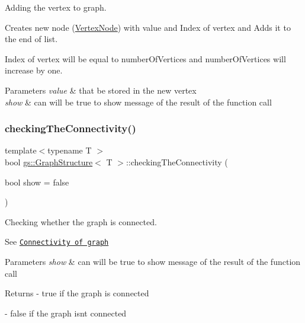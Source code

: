 Adding the vertex to graph. 

Creates new node (\mbox{\hyperlink{structgs_1_1_vertex_node}{Vertex\+Node}}) with \textquotesingle{}value\textquotesingle{} and Index of vertex and Adds it to the end of \textquotesingle{}list\textquotesingle{}.

Index of vertex will be equal to \textquotesingle{}number\+Of\+Vertices\textquotesingle{} and \textquotesingle{}number\+Of\+Vertices\textquotesingle{} will increase by one.


\begin{DoxyParams}{Parameters}
{\em value} & that be stored in the new vertex \\
\hline
{\em show} & can will be true to show message of the result of the function call \\
\hline
\end{DoxyParams}
\mbox{\label{classgs_1_1_graph_structure_a969a88dd678fd5b16884a6ab2cb68a60}} 
\subsubsection{\texorpdfstring{checking\+The\+Connectivity()}{checkingTheConnectivity()}}
{\footnotesize\ttfamily template$<$typename T $>$ \\
bool \mbox{\hyperlink{classgs_1_1_graph_structure}{gs\+::\+Graph\+Structure}}$<$ T $>$\+::checking\+The\+Connectivity (\begin{DoxyParamCaption}\item[{bool}]{show = {\ttfamily false} }\end{DoxyParamCaption})}



Checking whether the graph is connected. 

See \href{https://en.wikipedia.org/w/index.php?search=Connectivity+graph+theory&title=Special%3ASearch&fulltext=1&ns0=1}{\tt Connectivity of graph} 
\begin{DoxyParams}{Parameters}
{\em show} & can will be true to show message of the result of the function call \\
\hline
\end{DoxyParams}
\begin{DoxyReturn}{Returns}
-\/ true if the graph is connected 

-\/ false if the graph isn\textquotesingle{}t connected 
\end{DoxyReturn}
\mbox{\label{classgs_1_1_graph_structure_a6a9516f3f46cbbcdc50741e342a22ae4}} 
